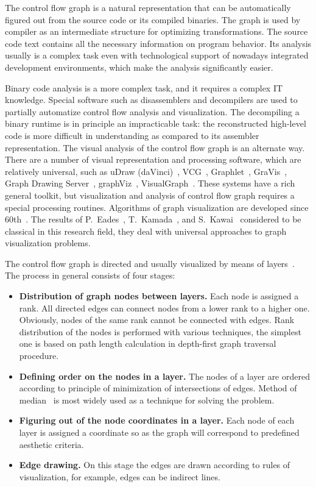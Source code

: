 \documentclass[conference]{IEEEtran}
\begin{document}
The control flow graph is a natural representation that can be automatically figured out from the source code or its compiled binaries.  The graph is used by compiler as an intermediate structure for optimizing transformations.  The source code text contains all the necessary information on program behavior.  Its analysis usually is a complex task even with technological support of nowadays integrated development environments, which make the analysis significantly easier.

Binary code analysis is a more complex task, and it requires a complex IT knowledge.  Special software such as disassemblers and decompilers are used to partially automatize control flow analysis and visualization.  The decompiling a binary runtime is in principle an impracticable task: the reconstructed high-level code is more difficult in understanding as compared to its assembler representation.  The visual analysis of the control flow graph is an alternate way.  There are a number of visual representation and processing software, which are relatively universal, such as uDraw (daVinci)~\cite{10}, VCG~\cite{14}, Graphlet~\cite{12}, GraVis~\cite{13}, Graph Drawing Server~\cite{9}, graphViz~\cite{11}, VisualGraph~\cite{15}.  These systems have a rich general toolkit, but visualization and analysis of control flow graph requires a special processing routines. Algorithms of graph visualization are developed since 60th~\cite{7}.  The results of P.~Eades~\cite{5}, T.~Kamada~\cite{q1}, and S.~Kawai~\cite{6} considered to be classical in this research field, they deal with universal approaches to graph visualization problems.

The control flow graph is directed and usually visualized by means of layers~\cite{4}.  The process in general consists of four stages:
\begin{itemize}
\item [] \textbf{Distribution of graph nodes between layers.} Each node is assigned a rank.  All directed edges can connect nodes from a lower rank to a higher one.  Obviously, nodes of the same rank cannot be connected with edges.  Rank distribution of the nodes is performed with various techniques, the simplest one is based on path length calculation in depth-first graph traversal procedure.
\item []\textbf{Defining order on the nodes in a layer.} The nodes of a layer are ordered according to principle of minimization of intersections of edges.  Method of median~\cite{8} is most widely used as a technique for solving the problem.
\item []\textbf{Figuring out of the node coordinates in a layer.} Each node of each layer is assigned a coordinate so as the graph will correspond to predefined aesthetic criteria.
\item []\textbf{Edge drawing.} On this stage the edges are drawn according to rules of visualization, for example, edges can be indirect lines.
\end{itemize}
\end{document}
